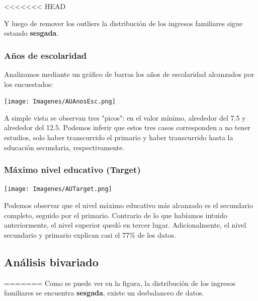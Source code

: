 \documentclass[a4paper]{article}
\begin{document}
<<<<<<< HEAD
           
 
            Y luego de remover los outliers la distribución de los ingresos familiares sigue estando \textbf{sesgada}.

            \subsubsection{Años de escolaridad}
           
            Analizamos mediante un gráfico de barras los años de escolaridad alcanzados por los encuestados:
           
            \begin{center}
                \texttt{[image: Imagenes/AUAnosEsc.png]}
            \end{center}
           
            A simple vista se observan tres "picos": en el valor mínimo, alrededor del 7.5 y alrededor del 12.5. Podemos inferir que estos tres casos corresponden a no tener estudios, solo haber transcurrido el primario y haber transcurrido hasta la educación secundaria, respectivamente.
           
            \subsubsection{Máximo nivel educativo (Target)}
           
            \begin{center}
                \texttt{[image: Imagenes/AUTarget.png]}    
            \end{center}
           
            Podemos observar que el nivel máximo educativo más alcanzado es el secundario completo, seguido por el primario. Contrario de lo que habíamos intuido anteriormente, el nivel superior quedó en tercer lugar. Adicionalmente, el nivel secundario y primario explican casi el 77\% de los datos.

    
    \newpage
    
    \subsection{Análisis bivariado}
=======
             Como se puede ver en la figura, la distribución de los ingresos familiares se encuentra \textbf{sesgada}, existe un desbalanceo de datos.
    
\end{document}

